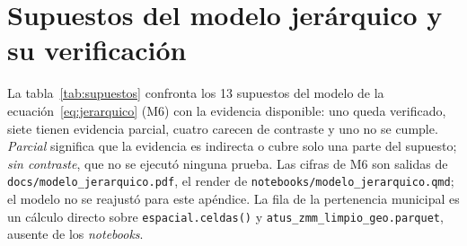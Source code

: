 \section{Supuestos del modelo jerárquico y su verificación}\label{app:supuestos}

La tabla~\ref{tab:supuestos} confronta los 13 supuestos del modelo de la
ecuación~\eqref{eq:jerarquico} (M6) con la evidencia disponible: uno queda
verificado, siete tienen evidencia parcial,
cuatro carecen de contraste y uno no se cumple. \emph{Parcial} significa que la evidencia es
indirecta o cubre solo una parte del supuesto; \emph{sin contraste}, que no se
ejecutó ninguna prueba. Las cifras de M6 son salidas de
\texttt{docs/modelo\_jerarquico.pdf}, el render de
\texttt{notebooks/modelo\_jerarquico.qmd}; el modelo no se reajustó para este
apéndice. La fila de la pertenencia municipal es un cálculo directo sobre
\texttt{espacial.celdas()} y \texttt{atus\_zmm\_limpio\_geo.parquet}, ausente de
los \emph{notebooks}.

